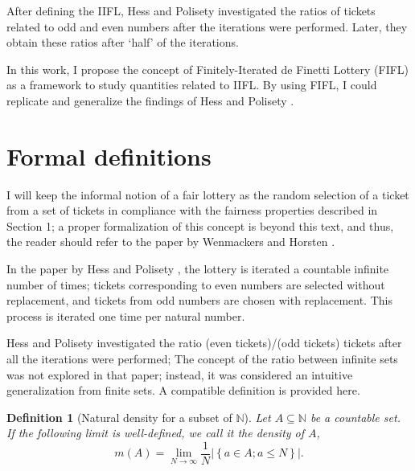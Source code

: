 \documentclass{article}
\newtheorem{definition}{Definition}
\newcommand{\N}{\mathbb{N}}
\newcommand{\card}[1]{\left| #1 \right|}
\newcommand{\sset}[1]{\left\{ #1 \right\}}
\newcommand{\ppar}[1]{\left( #1 \right)}
\begin{document}
After defining the IIFL, Hess and Polisety \cite{hess2023} investigated the ratios of tickets related to odd and even numbers after the iterations were performed.
%
Later, they obtain these ratios after `half' of the iterations.

In this work, I propose the concept of Finitely-Iterated de Finetti Lottery (FIFL) as a framework to study quantities related to IIFL.
%
By using FIFL, I could replicate and generalize the findings of Hess and Polisety \cite{hess2023}.


\section{Formal definitions}

I will keep the informal notion of a fair lottery as the random selection of a ticket from a set of tickets in compliance with the fairness properties described in Section 1;
a proper formalization of this concept is beyond this text, and thus, the reader should refer to the paper by Wenmackers and Horsten \cite{fair_infinite_lottery}.

In the paper by Hess and Polisety \cite{hess2023}, the lottery is iterated a countable infinite number of times; tickets corresponding to even numbers are selected without replacement, and tickets from odd numbers are chosen with replacement.
%
This process is iterated one time per natural number.

Hess and Polisety investigated the ratio (even tickets)/(odd tickets) tickets after all the iterations were performed;
The concept of the ratio between infinite sets was not explored in that paper; instead, it was considered an intuitive generalization from finite sets.
%
A compatible definition is provided here.

\begin{definition}[Natural density for a subset of $\N$]
Let $A \subseteq \N$ be a countable set.
If the following limit is well-defined, we call it the density of $A$,
\begin{equation}
    m\ppar{A} = 
    \lim_{N\rightarrow \infty} \frac{1}{N} \card{ \sset{a\in A; a\leq N} }.
\end{equation}
\end{definition}
\end{document}
